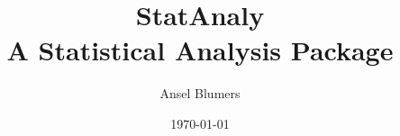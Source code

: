 \documentclass[12pt]{report}
\title{StatAnaly \\
        \large A Statistical Analysis Package}
\author{Ansel Blumers}
\date{\today}
\begin{document}
\maketitle
\tableofcontents{}











%
\end{document}
